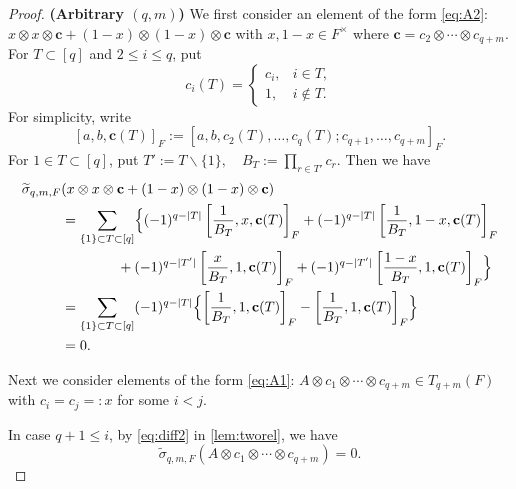 \documentclass[a4paper,12pt,reqno]{amsart}
\numberwithin{equation}{section}
\theoremstyle{definition}
\newcommand{\blue}{\color{blue}}
\newcommand{\vc}{\mathbf{c}}
\begin{document}
\begin{proof}
\smallskip
\noindent
\textbf{(Arbitrary $(q,m)$)}
    We first consider an element of the form \eqref{eq:A2}: $x\otimes x\otimes \vc+ (1-x)\otimes (1-x)\otimes \vc$ with $x, 1-x\in F^\times$ where $\vc=c_2\otimes \cdots \otimes c_{q+m}$.
For $T\subset[q]$ and $2\leq i\leq q$, put
\[
c_i(T)=
\begin{cases}
c_i,&i\in T,\\
1,&i\notin T.
\end{cases}
\]
For simplicity, write
\[
[a,b,\mathbf c(T)]_F
:=
[a,b,c_2(T),\ldots,c_q(T);
 c_{q+1},\ldots,c_{q+m}]_F.
\] 
    For $1\in T\subset [q]$, put
    $
    T':=T\smallsetminus\{1\},\quad 
    B_T:=\prod_{r\in T'}c_r.
    $
    Then we have 
    \begin{align}\label{eq:zero-A2}
        \widetilde \sigma_{q,m,F} & (x\otimes  x\otimes\vc +(1-x)\otimes(1-x)\otimes \vc)\\
        &=\sum_{\{1\}\subset T\subset [q]}\Bigl\{(-1)^{q-|T|}
        \left[
        \frac{1}{B_T},x,\vc(T)
        \right]_F
        +(-1)^{q-|T|}
        \left[
        \frac{1}{B_T},1-x,\vc(T)
        \right]_F \\
        &\qquad\qquad+(-1)^{q-|T'|}
        \left[
        \frac{x}{B_T},1,\vc(T)
        \right]_F 
        +(-1)^{q-|T'|}
        \left[
        \frac{1-x}{B_T},1,\vc(T)
        \right]_F \Bigr\}\\
        &=\sum_{\{1\}\subset T\subset[q]}(-1)^{q-|T|}\Bigl\{
        \left[
        \frac{1}{B_T},1,\vc(T)
        \right]_F
        -
        \left[
        \frac{1}{B_T},1,\vc(T)
        \right]_F \Bigr\}\\
        &=0.
    \end{align}
    
    Next we consider elements of the form \eqref{eq:A1}: $A\otimes c_1\otimes\cdots\otimes c_{q+m}\in T_{q+m}(F)$ with $c_i=c_j=:x$ for some $i<j$.
    
    In case $q+1\leq i$, by \eqref{eq:diff2} in \autoref{lem:tworel}, we have
    \[
    \widetilde \sigma_{q,m,F}(A\otimes c_1\otimes\cdots\otimes c_{q+m})=0.
    \]




\end{proof}
\end{document}
